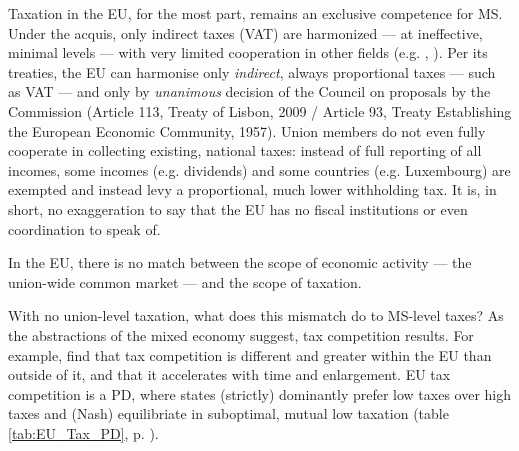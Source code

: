 \documentclass[11pt,a4paper,oneside,openright]{article}
\begin{document}



Taxation in the \gls{EU}, for the most part, remains an exclusive competence for \gls{MS}. Under the acquis, only indirect taxes (VAT) are harmonized --- at ineffective, minimal levels --- with very limited cooperation in other fields (e.g. \citealt{EuropeanCommission2009}, \citealt{TaxCoordinationandTaxCompetitionintheEuropeanUnion-EvaluatingtheCodeofConductonBusinessTaxation2001}). Per its treaties, the \gls{EU} can harmonise only \emph{indirect}, always proportional taxes --- such as \gls{VAT} --- and only by \emph{unanimous} decision of the Council on proposals by the Commission (Article 113, Treaty of Lisbon, 2009 / Article 93, Treaty Establishing the European Economic Community, 1957). Union members do not even fully cooperate in collecting existing, national taxes: instead of full reporting of all incomes, some incomes (e.g. dividends) and some countries (e.g. Luxembourg) are exempted and instead levy a proportional, much lower withholding tax. It is, in short, no exaggeration to say that the \gls{EU} has no fiscal institutions or even coordination to speak of.

In the \gls{EU}, there is no match between the scope of economic activity --- the union-wide common market --- and the scope of taxation. 

With no union-level taxation, what does this mismatch do to 
\gls{MS}-level taxes? As the abstractions of the mixed economy suggest, tax competition results. For example, \cite{Genschel2009} find that tax competition is different and greater within the \gls{EU} than outside of it, and that it accelerates with time and enlargement. \gls{EU} tax competition is a \gls{PD}, where states (strictly) dominantly prefer low taxes over high taxes and (Nash) equilibriate in suboptimal, mutual low taxation (table \ref{tab:EU_Tax_PD}, p. \pageref{tab:EU_Tax_PD}).
\end{document}

